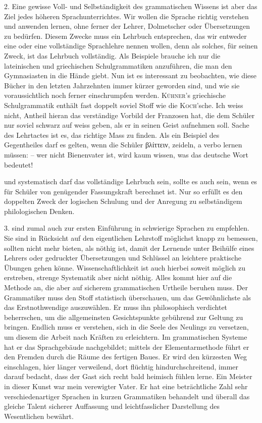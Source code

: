 2. Eine gewisse Voll- und Selbständigkeit des grammatischen Wissens ist aber das Ziel jedes höheren Sprachunterrichtes. Wir wollen die Sprache richtig \label{sp.112} verstehen und anwenden lernen, ohne ferner der Lehrer, Dolmetscher oder Übersetzungen zu bedürfen. Diesem Zwecke muss ein Lehrbuch entsprechen, das wir entweder eine  oder eine vollständige Sprachlehre nennen wollen, denn als solches, für seinen Zweck, ist das Lehrbuch vollständig. Als Beispiele brauche ich nur die lateinischen und griechischen Schulgrammatiken anzuführen, die man den Gymnasiasten in die Hände giebt. Nun ist es interessant zu beobachten, wie diese Bücher in den letzten Jahrzehnten immer kürzer geworden sind, und wie sie voraussichtlich noch ferner einschrumpfen werden. \textsc{Kühner}’s griechische Schulgrammatik enthält fast doppelt soviel Stoff wie die \textsc{Koch}’sche. Ich weiss nicht,  Antheil hieran das verständige Vorbild der Franzosen hat, die dem Schüler nur soviel schwarz auf weiss geben, als er in seinen Geist aufnehmen soll. Sache des Lehrtactes ist es, das richtige Mass zu finden. Als ein Beispiel des Gegentheiles darf es gelten, wenn die Schüler βλίττειν, zeideln, a verbo lernen müssen: – wer nicht Bienenvater ist, wird kaum wissen, was das deutsche Wort bedeutet!

 und systematisch darf das vollständige Lehrbuch sein, sollte es auch sein, wenn es für Schüler von genügender Fassungskraft berechnet ist. Nur so erfüllt es den doppelten Zweck der logischen Schulung und der Anregung zu selbständigem philologischen Denken.

3.  sind zumal auch zur ersten Einführung in schwierige Sprachen zu empfehlen. Sie sind in Rücksicht auf den eigentlichen Lehrstoff möglichst knapp zu bemessen, sollten nicht mehr bieten, als nöthig ist, damit der Lernende unter Beihülfe \label{fp.118} eines Lehrers oder gedruckter Übersetzungen und Schlüssel an leichtere praktische Übungen gehen könne. Wissenschaftlichkeit ist auch hierbei soweit möglich zu erstreben, strenge Systematik aber nicht nöthig. Alles kommt hier auf die Methode an, die aber auf sicherem grammatischen Urtheile beruhen muss. Der Grammatiker muss den Stoff statistisch überschauen, um das Gewöhnlichste als das Erstnothwendige auszuwählen. Er muss ihn philosophisch verdichtet beherrschen, um die allgemeinsten Gesichtspunkte gebührend zur Geltung zu bringen. Endlich muss er verstehen, sich in die Seele des Neulings zu versetzen, um diesem die Arbeit nach Kräften zu erleichtern. Im grammatischen Systeme hat er das Sprachgebäude nachgebildet; mittels der Elementarmethode führt er den Fremden durch die Räume des fertigen Baues. Er wird den kürzesten Weg einschlagen, hier länger verweilend, dort flüchtig hindurchschreitend, immer darauf bedacht, dass der Gast sich recht bald heimisch fühlen lerne. Ein Meister in dieser Kunst war mein verewigter Vater. Er hat eine beträchtliche Zahl sehr verschiedenartiger Sprachen in kurzen Grammatiken behandelt und überall das gleiche Talent sicherer Auffassung und leichtfasslicher Darstellung des Wesentlichen bewährt.

